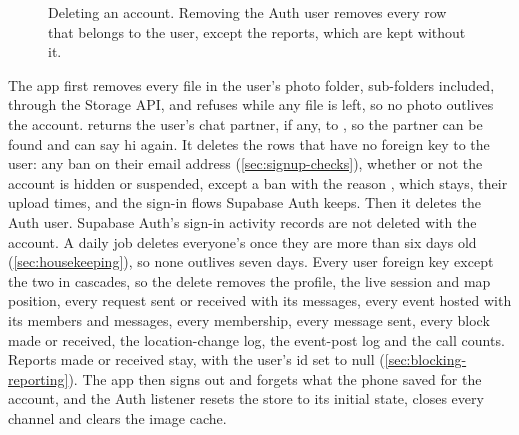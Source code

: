 \begin{figure}[ht]
  \centering
  
  \caption{Deleting an account. Removing the Auth user removes every row that belongs to the user, except
    the reports, which are kept without it.}
  \label{fig:seq-delete}
\end{figure}

The app first removes every file in the user's photo folder, sub-folders included, through the Storage
API, and  refuses while any file is left, so no photo outlives the account.
 returns the user's chat partner, if any, to , so the partner can be
found and can say hi again. It deletes the rows that have no foreign key to the user: any ban on their
email address (\cref{sec:signup-checks}), whether or not the account is hidden or suspended, except a ban
with the reason , which stays, their upload times, and the sign-in flows Supabase Auth keeps.
Then it deletes the Auth user. Supabase Auth's sign-in activity records are not deleted with the account.
A daily job deletes everyone's once they are more than six days old (\cref{sec:housekeeping}), so none
outlives seven days. Every user foreign key
except the two in  cascades, so the delete removes the profile, the live session and map
position, every request sent or received with its messages, every event hosted with its members and
messages, every membership, every message sent, every block made or received, the location-change log,
the event-post log and the call counts. Reports made or received stay, with the user's id set to null
(\cref{sec:blocking-reporting}). The app then
signs out and forgets what the phone saved for the account, and the Auth listener resets the store to its
initial state, closes every channel and clears the image cache.
